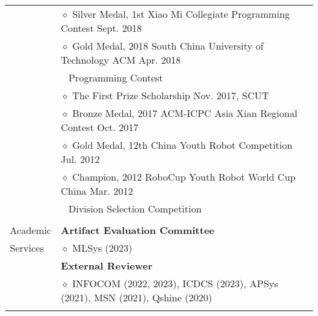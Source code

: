 \documentclass[letterpaper, 11pt]{article}
\begin{document}
\begin{longtable}{p{1in}p{5in}}
& $\diamond$ Silver Medal, 1st Xiao Mi Collegiate Programming Contest \hfill Sept. 2018 \\

& $\diamond$ Gold Medal, 2018 South China University of Technology ACM \hfill Apr. 2018 \\
& $\ \ $ Programming Contest \\

& $\diamond$ The First Prize Scholarship \hfill Nov. 2017, SCUT \\

& $\diamond$ Bronze Medal, 2017 ACM-ICPC Asia Xian Regional Contest \hfill Oct. 2017 \\

& $\diamond$ Gold Medal, 12th China Youth Robot Competition \hfill Jul. 2012 \\

& $\diamond$ Champion, 2012 RoboCup Youth Robot World Cup China \hfill Mar. 2012 \\
& $\ \ $ Division Selection Competition \\

& \\






{Academic}
& \textbf{Artifact Evaluation Committee} \\
{Services}
& $\diamond$ MLSys (2023) \\
& \textbf{External Reviewer} \\
& $\diamond$ INFOCOM (2022, 2023), ICDCS (2023), APSys (2021), MSN (2021), Qshine (2020) \\
& \\


\end{longtable}
\end{document}
